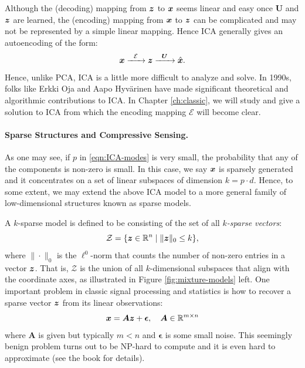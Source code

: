 \documentclass[../../book-main.tex]{subfiles}
\begin{document}
Although the (decoding) mapping from $\bm{z}$ to $\bm{x}$ seems linear and easy once $\boldsymbol{U}$ and $\bm{z}$ are learned, the (encoding) mapping from $\bm{x}$ to $\bm{z}$ can be complicated and may not be represented by a simple linear mapping. Hence ICA generally gives an autoencoding of the form:
\begin{equation}
    \bm{x}   \xrightarrow{\hspace{2mm} \mathcal{E}\hspace{2mm}} \bm{z}  \xrightarrow{\hspace{2mm} \boldsymbol{U} \hspace{2mm}} \hat {\bm{x}}.
       \label{eqn:auto-encoding-ICA}
\end{equation}
Hence, unlike PCA, ICA is a little more difficult to analyze and solve. In 1990s, folks like Erkki Oja and Aapo Hyv\"{a}rinen \cite{hyvarinen-1997,Hyvrinen-2000} have made significant theoretical and algorithmic contributions to ICA. In Chapter \ref{ch:classic}, we will study and give a solution to ICA from which the encoding mapping $\mathcal{E}$ will become clear.



\paragraph{Sparse Structures and Compressive Sensing.}
As one may see, if $p$ in \eqref{eqn:ICA-modes} is very small, the probability that any of the components is non-zero is small. In this case, we say $\bm{x}$ is sparsely generated and it concentrates on a set of linear subspaces of dimension $k = p \cdot d$. Hence, to some extent, we may extend the above ICA model to a more general family of low-dimensional structures known as sparse models. 

A $k$-sparse model is defined to be consisting of the set of all {\em $k$-sparse vectors}:
\begin{equation}
    \mathcal{Z} = \{\bm{z} \in \mathbb{R}^n \mid \|\bm{z}\|_0 \le k\},
\end{equation}
where $\| \cdot \|_0$ is the $\ell^0$-norm that counts the number of non-zero entries in a vector $\bm{z}$. That is, $\mathcal{Z}$ is the union of all $k$-dimensional subspaces that align with the coordinate axes, as illustrated in Figure \ref{fig:mixture-models} left. One important problem in classic signal processing and statistics is how to recover a sparse vector $\bm{z}$ from its linear observations:
\begin{equation}
    \bm{x} = \boldsymbol{A} \bm{z} + \boldsymbol{\epsilon}, \quad \boldsymbol{A} \in \mathbb{R}^{m\times n}
    \label{eqn:sparse-model}
\end{equation}
where $\boldsymbol{A}$ is given but typically $m < n$ and $\boldsymbol{\epsilon}$ is some small noise. This seemingly benign problem turns out to be NP-hard to compute and it is even hard to approximate (see the book \cite{Wright-Ma-2022} for details). 
\end{document}
